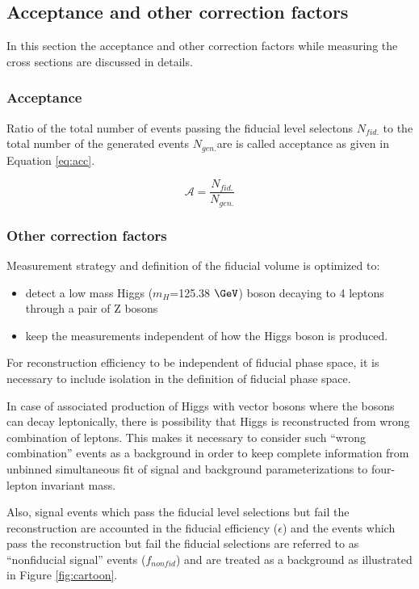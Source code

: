 
\subsection{Acceptance and other correction factors}
In this section the acceptance and other correction factors while measuring the cross sections are discussed in details. 
\subsubsection{Acceptance}
Ratio of the total number of events passing the fiducial level selectons $N_{fid.}$ to the total number of the generated events $N_{gen.}$are is called acceptance as given in Equation \ref{eq:acc}. 

\begin{equation}
	\mathscr{A} = \frac{N_{fid.} }{N_{gen.} } %
 \label{eq:acc}
\end{equation}

\subsubsection{Other correction factors}
Measurement strategy and definition of the fiducial volume is optimized to:
\begin{itemize}
        \item detect a low mass Higgs ($m_{H}$=125.38 $\GeV$) boson decaying to 4 leptons through a pair of Z bosons
        \item keep the measurements independent of how the Higgs boson is produced.
\end{itemize}

For reconstruction efficiency to be independent of fiducial phase space, it is necessary to include isolation in the definition of fiducial phase space. %
\par
In case of associated production of Higgs with vector bosons where the bosons can decay leptonically, there is possibility that Higgs is reconstructed from wrong combination of leptons.
This makes it necessary to consider such ``wrong combination'' events as a background in order to keep complete information from unbinned simultaneous fit of signal and background parameterizations to four-lepton invariant mass.
\par
Also, signal events which pass the fiducial level selections but fail the reconstruction are accounted  in the fiducial efficiency
($\epsilon$) and the events which pass the reconstruction but fail the fiducial selections are referred to as ``nonfiducial signal'' events ($f_{nonfid}$) and are treated as a background as illustrated in Figure \ref{fig:cartoon}. %

